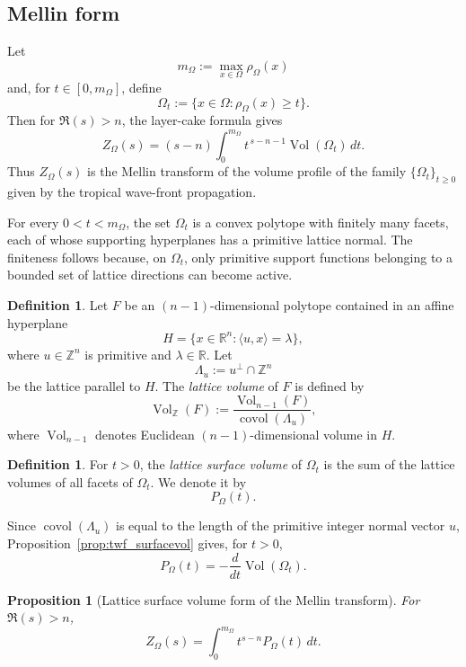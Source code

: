 \documentclass[a4paper,american,11pt]{amsart}
\theoremstyle{plain}
\newtheorem{proposition}[theorem]{Proposition}
\theoremstyle{definition}
\newtheorem{definition}[theorem]{Definition}
\newcommand{\Z}{\mathbb Z}
\newcommand{\R}{\mathbb R}
\begin{document}
\subsection{Mellin form}

Let
\[
m_\Omega:=\max_{x\in \Omega}\rho_\Omega(x)
\]
and, for \(t\in[0,m_\Omega]\), define
\[
\Omega_t:=\{x\in \Omega:\rho_\Omega(x)\ge t\}.
\]
Then for \(\Re(s)>n\), the layer-cake formula gives
\[
Z_\Omega(s)
=
(s-n)\int_0^{m_\Omega} t^{\,s-n-1}\operatorname{Vol}(\Omega_t)\,dt.
\]
Thus \(Z_\Omega(s)\) is the Mellin transform of the volume profile of the
family \(\{\Omega_t\}_{t\ge0}\) given by the tropical wave-front propagation.

For every \(0<t<m_\Omega\), the set \(\Omega_t\) is a convex polytope with
finitely many facets, each of whose supporting hyperplanes has a primitive
lattice normal. The finiteness follows because, on \(\Omega_t\), only
primitive support functions belonging to a bounded set of lattice directions
can become active.

\begin{definition}\label{def:surfacevolume}
Let \(F\) be an \((n-1)\)-dimensional polytope contained in an affine
hyperplane
\[
H=\{x\in\R^n:\langle u,x\rangle=\lambda\},
\]
where \(u\in\Z^n\) is primitive and \(\lambda\in\R\). Let
\[
\Lambda_u:=u^\perp\cap\Z^n
\]
be the lattice parallel to \(H\). The \emph{lattice volume} of \(F\) is
defined by
\[
\operatorname{Vol}_{\Z}(F)
:=
\frac{\operatorname{Vol}_{n-1}(F)}
{\operatorname{covol}(\Lambda_u)},
\]
where \(\operatorname{Vol}_{n-1}\) denotes Euclidean \((n-1)\)-dimensional volume in \(H\).
\end{definition}

\begin{definition}\label{def:wfsurfacevolume}
For \(t>0\), the \emph{lattice surface volume} of \(\Omega_t\) is the sum of
the lattice volumes of all facets of \(\Omega_t\). We denote it by
\[
P_\Omega(t).
\]
\end{definition}

Since \(\operatorname{covol}(\Lambda_u)\) is equal to the length of the primitive integer
normal vector \(u\), Proposition~\ref{prop:twf_surfacevol} gives, for
\(t>0\),
\[
P_\Omega(t)=-\frac{d}{dt}\operatorname{Vol}(\Omega_t).
\]

\begin{proposition}[Lattice surface volume form of the Mellin transform]
\label{prop:perimeter-mellin}
For \(\Re(s)>n\),
\[
Z_\Omega(s)=\int_0^{m_\Omega} t^{s-n}P_\Omega(t)\,dt.
\]
\end{proposition}
\end{document}
